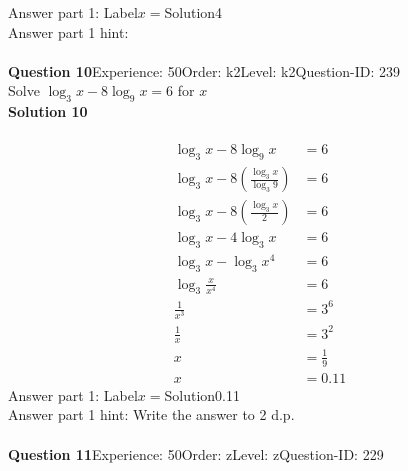 \documentclass{article}
\begin{document}
Answer part 1: \hspace{10pt}Label\hspace{10pt}$x=$\hspace{10pt}Solution\hspace{10pt}4\\
Answer part 1 hint: \hspace{15pt}\\
\\[4pt]
\noindent\textbf{Question 10}\hspace{20pt}Experience: 50\hspace{20pt}Order: k2\hspace{20pt}Level: k2\hspace{20pt}Question-ID: 239\\[2pt]
Solve $\log_{3}x-8\log_{9}x=6$ for $x$\\[4pt]
\noindent\textbf{Solution 10}\\[2pt]
\\[-35pt]\begin{align*}
\log_{3}x-8\log_{9}x&=6\\[2pt]
\log_{3}x-8\left(\displaystyle\frac{\log_{3}x}{\log_{3}9}\right)&=6\\[2pt]
\log_{3}x-8\left(\displaystyle\frac{\log_{3}x}{2}\right)&=6\\[2pt]
\log_{3}x-4\log_{3}x&=6\\[2pt]
\log_{3}x-\log_{3}x^4&=6\\[2pt]
\log_{3}\displaystyle\frac{x}{x^4}&=6\\[2pt]
\displaystyle\frac{1}{x^3}&=3^6\\[2pt]
\displaystyle\frac{1}{x}&=3^2\\[2pt]
x&=\displaystyle\frac{1}{9}\\[2pt]
x&=0.11
\end{align*}
Answer part 1: \hspace{10pt}Label\hspace{10pt}$x=$\hspace{10pt}Solution\hspace{10pt}0.11\\
Answer part 1 hint: \hspace{15pt}Write the answer to 2 d.p.\\
\\[4pt]
\noindent\textbf{Question 11}\hspace{20pt}Experience: 50\hspace{20pt}Order: z\hspace{20pt}Level: z\hspace{20pt}Question-ID: 229\\[2pt]
\end{document}
